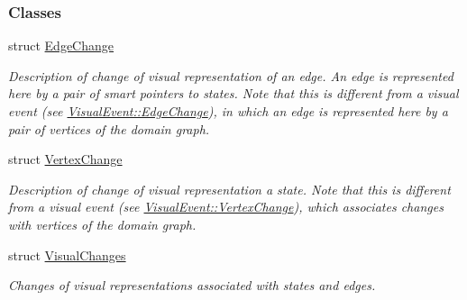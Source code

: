 \subsubsection*{Classes}
\begin{DoxyCompactItemize}
\item 
struct \hyperlink{structslb_1_1core_1_1ui_1_1EventBase_1_1EdgeChange}{Edge\+Change}
\begin{DoxyCompactList}\small\item\em Description of change of visual representation of an edge. An edge is represented here by a pair of smart pointers to states. Note that this is different from a visual event (see \hyperlink{structslb_1_1core_1_1ui_1_1VisualEvent_1_1EdgeChange}{Visual\+Event\+::\+Edge\+Change}), in which an edge is represented here by a pair of vertices of the domain graph. \end{DoxyCompactList}\item 
struct \hyperlink{structslb_1_1core_1_1ui_1_1EventBase_1_1VertexChange}{Vertex\+Change}
\begin{DoxyCompactList}\small\item\em Description of change of visual representation a state. Note that this is different from a visual event (see \hyperlink{structslb_1_1core_1_1ui_1_1VisualEvent_1_1VertexChange}{Visual\+Event\+::\+Vertex\+Change}), which associates changes with vertices of the domain graph. \end{DoxyCompactList}\item 
struct \hyperlink{structslb_1_1core_1_1ui_1_1EventBase_1_1VisualChanges}{Visual\+Changes}
\begin{DoxyCompactList}\small\item\em Changes of visual representations associated with states and edges. \end{DoxyCompactList}\end{DoxyCompactItemize}
